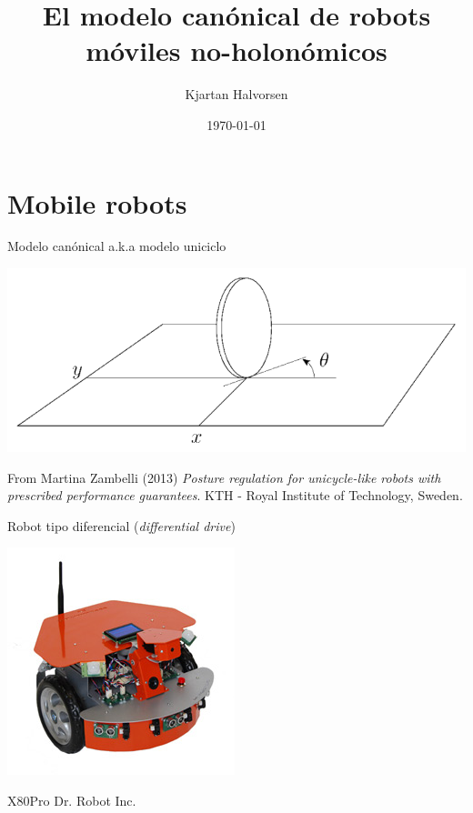 \documentclass[presentation,aspectratio=169]{beamer}
\author{Kjartan Halvorsen}
\date{\today}
\title{El modelo canónical de robots móviles no-holonómicos}
\begin{document}
\maketitle

\section{Mobile robots}
\label{sec:org2c2f45a}

\begin{frame}[label={sec:orge6b4bd1}]{Modelo canónical a.k.a modelo uniciclo}
\begin{center}
 \includegraphics[width=.6\linewidth]{../figures/unicycle-kth.png}
\end{center}

\footnotesize
From Martina Zambelli (2013) \emph{Posture regulation for unicycle-like robots with prescribed performance guarantees}. KTH - Royal Institute of Technology, Sweden.
\end{frame}



\begin{frame}[label={sec:orgd8245f0}]{Robot tipo diferencial (\emph{differential drive})}
\begin{center}
 \includegraphics[width=.5\linewidth]{../figures/X80Pro.jpg}
\end{center}

X80Pro Dr. Robot Inc.
\end{frame}
\end{document}
